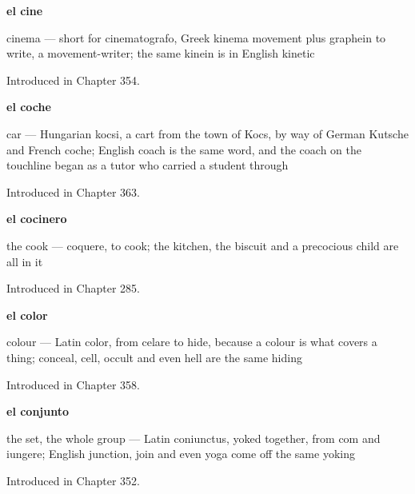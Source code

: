 \noindent\begin{minipage}[t]{\linewidth}
\raggedright
\textbf{el cine}\par
\small cinema — short for cinematografo, Greek kinema movement plus graphein to write, a movement-writer; the same kinein is in English kinetic\par
\footnotesize Introduced in Chapter 354.
\end{minipage}\par\medskip

\noindent\begin{minipage}[t]{\linewidth}
\raggedright
\textbf{el coche}\par
\small car — Hungarian kocsi, a cart from the town of Kocs, by way of German Kutsche and French coche; English coach is the same word, and the coach on the touchline began as a tutor who carried a student through\par
\footnotesize Introduced in Chapter 363.
\end{minipage}\par\medskip

\noindent\begin{minipage}[t]{\linewidth}
\raggedright
\textbf{el cocinero}\par
\small the cook — coquere, to cook; the kitchen, the biscuit and a precocious child are all in it\par
\footnotesize Introduced in Chapter 285.
\end{minipage}\par\medskip

\noindent\begin{minipage}[t]{\linewidth}
\raggedright
\textbf{el color}\par
\small colour — Latin color, from celare to hide, because a colour is what covers a thing; conceal, cell, occult and even hell are the same hiding\par
\footnotesize Introduced in Chapter 358.
\end{minipage}\par\medskip

\noindent\begin{minipage}[t]{\linewidth}
\raggedright
\textbf{el conjunto}\par
\small the set, the whole group — Latin coniunctus, yoked together, from com and iungere; English junction, join and even yoga come off the same yoking\par
\footnotesize Introduced in Chapter 352.
\end{minipage}\par\medskip

